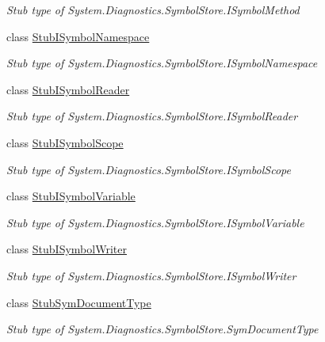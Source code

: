 \begin{DoxyCompactItemize}
\begin{DoxyCompactList}\small\item\em Stub type of System.\-Diagnostics.\-Symbol\-Store.\-I\-Symbol\-Method\end{DoxyCompactList}\item 
class \hyperlink{class_system_1_1_diagnostics_1_1_symbol_store_1_1_fakes_1_1_stub_i_symbol_namespace}{Stub\-I\-Symbol\-Namespace}
\begin{DoxyCompactList}\small\item\em Stub type of System.\-Diagnostics.\-Symbol\-Store.\-I\-Symbol\-Namespace\end{DoxyCompactList}\item 
class \hyperlink{class_system_1_1_diagnostics_1_1_symbol_store_1_1_fakes_1_1_stub_i_symbol_reader}{Stub\-I\-Symbol\-Reader}
\begin{DoxyCompactList}\small\item\em Stub type of System.\-Diagnostics.\-Symbol\-Store.\-I\-Symbol\-Reader\end{DoxyCompactList}\item 
class \hyperlink{class_system_1_1_diagnostics_1_1_symbol_store_1_1_fakes_1_1_stub_i_symbol_scope}{Stub\-I\-Symbol\-Scope}
\begin{DoxyCompactList}\small\item\em Stub type of System.\-Diagnostics.\-Symbol\-Store.\-I\-Symbol\-Scope\end{DoxyCompactList}\item 
class \hyperlink{class_system_1_1_diagnostics_1_1_symbol_store_1_1_fakes_1_1_stub_i_symbol_variable}{Stub\-I\-Symbol\-Variable}
\begin{DoxyCompactList}\small\item\em Stub type of System.\-Diagnostics.\-Symbol\-Store.\-I\-Symbol\-Variable\end{DoxyCompactList}\item 
class \hyperlink{class_system_1_1_diagnostics_1_1_symbol_store_1_1_fakes_1_1_stub_i_symbol_writer}{Stub\-I\-Symbol\-Writer}
\begin{DoxyCompactList}\small\item\em Stub type of System.\-Diagnostics.\-Symbol\-Store.\-I\-Symbol\-Writer\end{DoxyCompactList}\item 
class \hyperlink{class_system_1_1_diagnostics_1_1_symbol_store_1_1_fakes_1_1_stub_sym_document_type}{Stub\-Sym\-Document\-Type}
\begin{DoxyCompactList}\small\item\em Stub type of System.\-Diagnostics.\-Symbol\-Store.\-Sym\-Document\-Type\end{DoxyCompactList}\item 

\end{DoxyCompactItemize}
